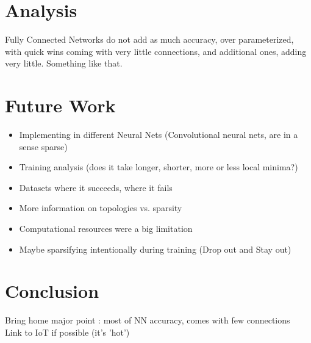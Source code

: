 \documentclass{article}
\begin{document}
\section{Analysis}
Fully Connected Networks do not add as much accuracy, over parameterized, with quick wins coming with very little connections, and additional ones, adding very little. Something like that.

\section{Future Work}
\begin{itemize}
\item Implementing in different Neural Nets (Convolutional neural nets, are in a sense sparse)
\item Training analysis (does it take longer, shorter, more or less local minima?)
\item Datasets where it succeeds, where it fails
\item More information on topologies vs. sparsity
\item Computational resources were a big limitation
\item Maybe sparsifying intentionally during training (Drop out and Stay out)
\end{itemize}

\section{Conclusion}
Bring home major point : most of NN accuracy, comes with few connections\\
Link to IoT if possible (it's 'hot')



\end{document}
